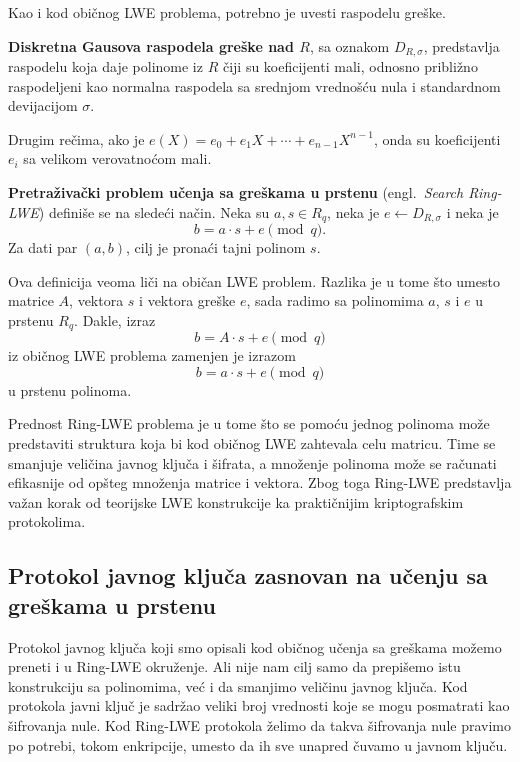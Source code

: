 Kao i kod običnog LWE problema, potrebno je uvesti raspodelu greške.
\begin{definition}
    \textbf{Diskretna Gausova raspodela greške nad $R$}, sa oznakom $D_{R,\sigma}$, 
    predstavlja raspodelu koja daje polinome iz $R$ čiji su koeficijenti mali,
    odnosno približno raspodeljeni kao normalna raspodela sa srednjom vrednošću nula
    i standardnom devijacijom $\sigma$. 
    
    Drugim rečima, ako je $ e(X) = e_0 + e_1X + \cdots + e_{n-1}X^{n-1} $,
    onda su koeficijenti $e_i$ sa velikom verovatnoćom mali.
\end{definition}

\begin{definition}
    \textbf{Pretraživački problem učenja sa greškama u prstenu}
    (engl.\ \emph{Search Ring-LWE}) definiše se na sledeći način.
    Neka su $a,s \in R_q$, neka je $e \leftarrow D_{R,\sigma}$ i neka je
    \[
        b = a \cdot s + e \pmod q.
    \]
    Za dati par $(a,b)$, cilj je pronaći tajni polinom $s$.
\end{definition}

Ova definicija veoma liči na običan LWE problem.
Razlika je u tome što umesto matrice $A$, vektora $s$ i vektora greške $e$,
sada radimo sa polinomima $a$, $s$ i $e$ u prstenu $R_q$.
Dakle, izraz
\[
    b = A \cdot s + e \pmod q
\]
iz običnog LWE problema zamenjen je izrazom
\[
    b = a \cdot s + e \pmod q
\]
u prstenu polinoma.

Prednost Ring-LWE problema je u tome što se pomoću jednog polinoma može
predstaviti struktura koja bi kod običnog LWE zahtevala celu matricu. Time se
smanjuje veličina javnog ključa i šifrata, a množenje polinoma može se računati
efikasnije od opšteg množenja matrice i vektora. Zbog toga Ring-LWE predstavlja
važan korak od teorijske LWE konstrukcije ka praktičnijim kriptografskim protokolima.


\subsection{Protokol javnog ključa zasnovan na učenju sa greškama u prstenu}

Protokol javnog ključa koji smo opisali kod običnog učenja sa greškama 
možemo preneti i u Ring-LWE okruženje.
Ali nije nam cilj samo da prepišemo istu konstrukciju sa polinomima,
već i da smanjimo veličinu javnog ključa.
Kod protokola javni ključ je sadržao veliki broj vrednosti 
koje se mogu posmatrati kao šifrovanja nule.
Kod Ring-LWE protokola želimo da takva šifrovanja nule pravimo po potrebi,
tokom enkripcije, umesto da ih sve unapred čuvamo u javnom ključu.

